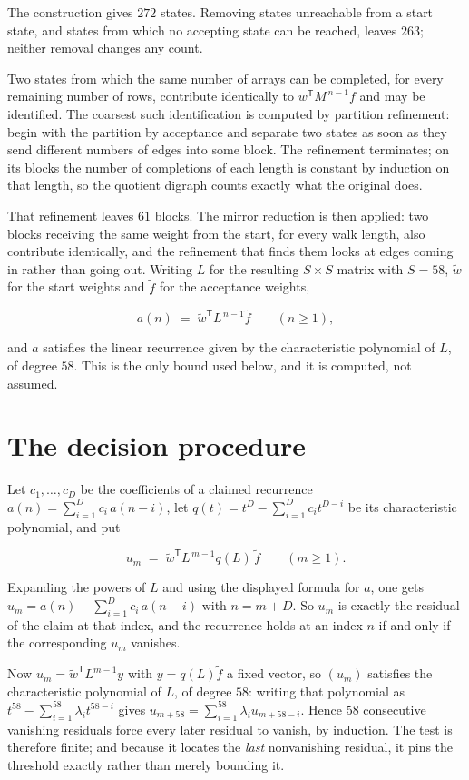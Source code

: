 \documentclass[11pt]{article}
\theoremstyle{definition}
\begin{document}
The construction gives $272$ states. Removing states unreachable from a start state, and states from which no accepting state can be reached, leaves $263$; neither removal changes any count.

Two states from which the same number of arrays can be completed, for every remaining number of rows, contribute identically to $w^{\mathsf T}M^{\,n-1}f$ and may be identified. The coarsest such identification is computed by partition refinement: begin with the partition by acceptance and separate two states as soon as they send different numbers of edges into some block. The refinement terminates; on its blocks the number of completions of each length is constant by induction on that length, so the quotient digraph counts exactly what the original does.

That refinement leaves $61$ blocks. The mirror reduction is then applied: two blocks receiving the same weight from the start, for every walk length, also contribute identically, and the refinement that finds them looks at edges coming in rather than going out. Writing $L$ for the resulting $S \times S$ matrix with $S = 58$, $\tilde w$ for the start weights and $\tilde f$ for the acceptance weights,

\[a(n) \;=\; \tilde w^{\mathsf T} L^{\,n-1} \tilde f \qquad (n \ge 1),\]

and $a$ satisfies the linear recurrence given by the characteristic polynomial of $L$, of degree $58$. This is the only bound used below, and it is computed, not assumed.

\section{The decision procedure}

Let $c_1,\dots,c_D$ be the coefficients of a claimed recurrence $a(n) = \sum_{i=1}^{D} c_i\,a(n-i)$, let $q(t) = t^{D} - \sum_{i=1}^{D} c_i t^{D-i}$ be its characteristic polynomial, and put

\[u_m \;=\; \tilde w^{\mathsf T} L^{\,m-1} q(L)\,\tilde f \qquad (m \ge 1).\]

Expanding the powers of $L$ and using the displayed formula for $a$, one gets $u_m = a(n) - \sum_{i=1}^{D} c_i\,a(n-i)$ with $n = m + D$. So $u_m$ is exactly the residual of the claim at that index, and the recurrence holds at an index $n$ if and only if the corresponding $u_m$ vanishes.

Now $u_m = \tilde w^{\mathsf T} L^{m-1} y$ with $y = q(L)\tilde f$ a fixed vector, so $(u_m)$ satisfies the characteristic polynomial of $L$, of degree $58$: writing that polynomial as $t^{58} - \sum_{i=1}^{58} \lambda_i t^{58-i}$ gives $u_{m+58} = \sum_{i=1}^{58} \lambda_i u_{m+58-i}$. Hence $58$ consecutive vanishing residuals force every later residual to vanish, by induction. The test is therefore finite; and because it locates the {\itshape last} nonvanishing residual, it pins the threshold exactly rather than merely bounding it.
\end{document}
